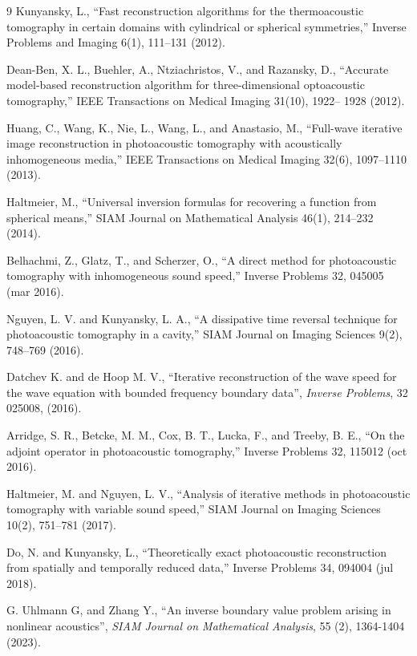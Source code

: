 \documentclass[11pt,reqno]{amsart}
\theoremstyle{remark}
\theoremstyle{italic_lemma}
\begin{document}
\begin{thebibliography}{9}
Kunyansky, L., “Fast reconstruction algorithms for the thermoacoustic tomography in certain domains with
cylindrical or spherical symmetries,” Inverse Problems and Imaging 6(1), 111–131 (2012).

Dean-Ben, X. L., Buehler, A., Ntziachristos, V., and Razansky, D., “Accurate model-based reconstruction algorithm
for three-dimensional optoacoustic tomography,” IEEE Transactions on Medical Imaging 31(10), 1922–
1928 (2012).

Huang, C., Wang, K., Nie, L., Wang, L., and Anastasio, M., “Full-wave iterative image reconstruction in photoacoustic
tomography with acoustically inhomogeneous media,” IEEE Transactions on Medical Imaging 32(6),
1097–1110 (2013).


Haltmeier, M., “Universal inversion formulas for recovering a function from spherical means,” SIAM Journal on
Mathematical Analysis 46(1), 214–232 (2014).

Belhachmi, Z., Glatz, T., and Scherzer, O., “A direct method for photoacoustic tomography with inhomogeneous
sound speed,” Inverse Problems 32, 045005 (mar 2016).

Nguyen, L. V. and Kunyansky, L. A., “A dissipative time reversal technique for photoacoustic tomography in a
cavity,” SIAM Journal on Imaging Sciences 9(2), 748–769 (2016).


Datchev K. and de Hoop M. V., “Iterative reconstruction of the wave speed for the wave equation with bounded frequency boundary data”, \textit{Inverse Problems}, 32 025008, (2016).


Arridge, S. R., Betcke, M. M., Cox, B. T., Lucka, F., and Treeby, B. E., “On the adjoint operator in photoacoustic
tomography,” Inverse Problems 32, 115012 (oct 2016).


Haltmeier, M. and Nguyen, L. V., “Analysis of iterative methods in photoacoustic tomography with variable
sound speed,” SIAM Journal on Imaging Sciences 10(2), 751–781 (2017).

Do, N. and Kunyansky, L., “Theoretically exact photoacoustic reconstruction from spatially and temporally
reduced data,” Inverse Problems 34, 094004 (jul 2018).


G. Uhlmann G, and Zhang Y., “An inverse boundary value problem arising in nonlinear acoustics”, \textit{SIAM Journal on Mathematical Analysis}, 55 (2), 1364-1404 (2023).


\end{thebibliography}
\end{document}
